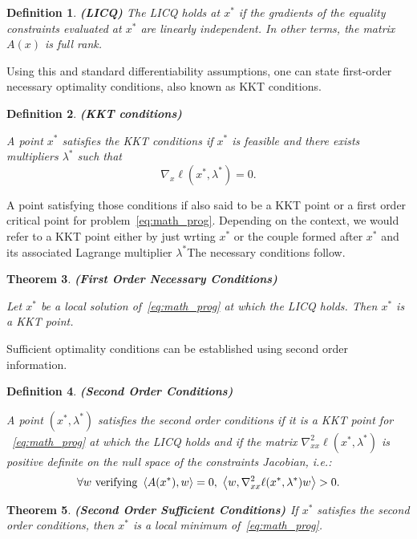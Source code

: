 \documentclass[10pt]{article}
\newtheorem{theorem}{Theorem}[]
\newtheorem{definition}[theorem]{Definition}
\numberwithin{equation}{section}
\begin{document}
	\begin{definition}\label{def:licq}
		\textbf{(LICQ)}
		The LICQ holds at $x^*$ if the gradients of the equality constraints evaluated at $x^*$ are linearly independent. In other terms, the matrix $A(x)$ is full rank.
	\end{definition}
	
	Using this and standard differentiability assumptions, one can state first-order necessary optimality conditions, also known as KKT conditions. 
	
	\begin{definition}\label{def:kkt_point}
		\textbf{(KKT conditions)}
		
		A point $x^*$ satisfies the KKT conditions if $x^* $ is feasible and there exists multipliers \(\lambda^*\) such that \[\nabla_x \ell (x^*,\lambda^*)=0.\]
	\end{definition}
	
	
	A point satisfying those conditions if also said to be a KKT point or a first order critical point for problem~\eqref{eq:math_prog}. Depending on the context, we would refer to a KKT point either by just wrting $x^*$ or the couple formed after $x^*$ and its associated Lagrange multiplier $\lambda^*$The necessary conditions follow.
	
	\begin{theorem}\label{theo:fonc}
		\textbf{(First Order Necessary Conditions)\cite[][Theorem 12.1]{nocedalwright:2006}}
		
		Let $x^*$ be a local solution of~\eqref{eq:math_prog} at which the LICQ holds. Then $x^*$ is a KKT point.
	\end{theorem}
	
	Sufficient optimality conditions can be established using second order information.
	
	\begin{definition}\label{def:soc}
		\textbf{(Second Order Conditions)}
		
		A point $(x^*,\lambda^*)$ satisfies the second order conditions if it is a KKT point for ~\eqref{eq:math_prog} at which the LICQ holds and if the matrix $\nabla_{xx}^2\ell(x^*,\lambda^*)$ is positive definite on the null space of the constraints Jacobian, i.e.:
		\[\forall w \text{ verifying } \left\langle {A(x^*)} , {w} \right\rangle=0,\ \left\langle {w} , {\nabla_{xx}^2\ell(x^*,\lambda^*)w} \right\rangle > 0.\]
	\end{definition}
	
	\begin{theorem} \textbf{(Second Order Sufficient Conditions) \cite[][Theorem 12.5]{nocedalwright:2006}}
		If $x^*$ satisfies the second order conditions, then $x^*$ is a local minimum of~\eqref{eq:math_prog}.
	\end{theorem}
	
\end{document}
